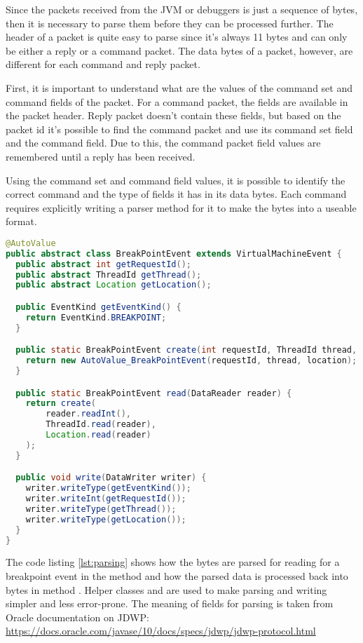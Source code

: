 \documentclass[..thesis.tex]{subfiles}
\begin{document}
Since the packets received from the JVM or debuggers is just a sequence of bytes, then it is necessary to parse them before they can be processed further.
The header of a packet is quite easy to parse since it's always 11 bytes and can only be either a reply or a command packet.
The data bytes of a packet, however, are different for each command and reply packet.

First, it is important to understand what are the values of the command set and command fields of the packet. 
For a command packet, the fields are available in the packet header.
Reply packet doesn't contain these fields, but based on the packet id it's possible to find the command packet and use its command set field and the command field.
Due to this, the command packet field values are remembered until a reply has been received. 

Using the command set and command field values, it is possible to identify the correct command and the type of fields it has in its data bytes.
Each command requires explicitly writing a parser method for it to make the bytes into a useable format.

\begin{lstlisting}[language=java, caption={\textit{Breakpoint event representation as a class with read and write methods for reading and writing the bytes for the packet data field.}},captionpos=b, label={lst:parsing}]
@AutoValue
public abstract class BreakPointEvent extends VirtualMachineEvent {
  public abstract int getRequestId();
  public abstract ThreadId getThread();
  public abstract Location getLocation();

  public EventKind getEventKind() {
    return EventKind.BREAKPOINT;
  }

  public static BreakPointEvent create(int requestId, ThreadId thread, Location location) {
    return new AutoValue_BreakPointEvent(requestId, thread, location);
  }

  public static BreakPointEvent read(DataReader reader) {
    return create(
        reader.readInt(),
        ThreadId.read(reader),
        Location.read(reader)
    );
  }

  public void write(DataWriter writer) {
    writer.writeType(getEventKind());
    writer.writeInt(getRequestId());
    writer.writeType(getThread());
    writer.writeType(getLocation());
  }
}
\end{lstlisting}

The code listing \ref{lst:parsing} shows how the bytes are parsed for reading for a breakpoint event in the method  and how the parsed data is processed back into bytes in method .
Helper classes  and  are used to make parsing and writing simpler and less error-prone.
The meaning of fields for parsing is taken from Oracle documentation on JDWP: \url{https://docs.oracle.com/javase/10/docs/specs/jdwp/jdwp-protocol.html} 
\end{document}
